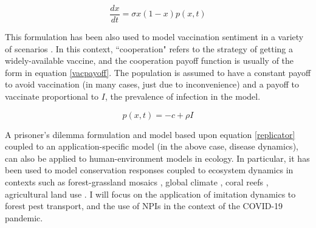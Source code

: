 \begin{equation}
    \frac{dx}{dt} = \sigma x(1 - x)p(x,t) 
    \label{replicator}
\end{equation}


This formulation has been also used to model vaccination sentiment in a variety of scenarios \cite{oraby2014influence,bauch2004vaccination,bauch2005imitation,bauch2012evolutionary}. In this context, ``cooperation" refers to the strategy of getting a widely-available vaccine, and the cooperation payoff function is usually of the form in equation \ref{vacpayoff}. The population is assumed to have a constant payoff to avoid vaccination (in many cases, just due to inconvenience) and a payoff to vaccinate proportional to $I$, the prevalence of infection in the model. 

\begin{equation}
    p(x,t) = - c + \rho I
    \label{vacpayoff}
\end{equation}


A prisoner's dilemma formulation and model based upon equation \ref{replicator} coupled to an application-specific model (in the above case, disease dynamics), can also be applied to human-environment models in ecology. In particular, it has been used to model conservation responses coupled to ecosystem dynamics in contexts such as forest-grassland mosaics \cite{innes2013impact,henderson2016alternative}, global climate \cite{bury2019charting}, coral reefs \cite{thampi2018socio}, agricultural land use \cite{gooding2018forest}. I will focus on the application of imitation dynamics to forest pest transport, and the use of NPIs in the context of the COVID-19 pandemic.


